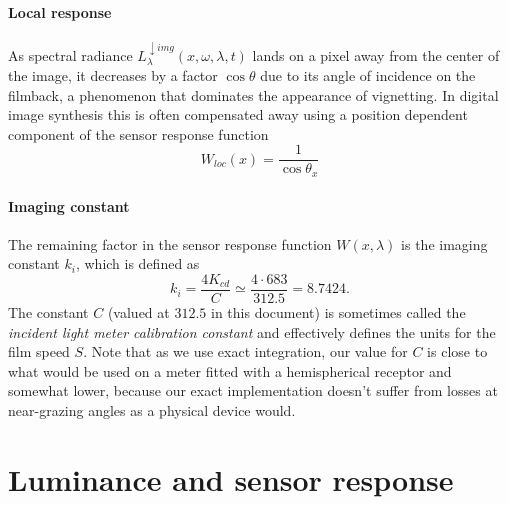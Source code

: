 \paragraph{Local response}
As spectral radiance $L^{\downarrow img}_{\lambda}(x, \omega, \lambda, t)$ lands
on a pixel away from the center of the image, it decreases by a factor
$\cos\theta$ due to its angle of incidence on the filmback, a phenomenon that
dominates the appearance of vignetting. In digital image synthesis this is often
compensated away using a position dependent component of the sensor response
function
\begin{equation}
W_{loc}(x) = \frac{1}{\cos\theta_x}
\end{equation}

\paragraph{Imaging constant}

The remaining factor in the sensor response function $W(x,\lambda)$ is the
imaging constant $k_i$, which is defined as
\begin{equation}\label{eqn:imaging_ki}
 k_i = \frac{4K_{cd}}{C} \simeq \frac{4\cdot683}{312.5} = 8.7424.
\end{equation}
The constant $C$ (valued at $312.5$ in this document) is sometimes called the \textsl{incident light meter
calibration constant} and effectively defines the units for the \gls{film speed} $S$.
Note that as we use exact integration, our value for $C$ is close to what would be used on a meter fitted with a hemispherical receptor and somewhat lower, because our exact implementation doesn't suffer from losses at near-grazing angles as a physical device would.


\section{Luminance and sensor response}

